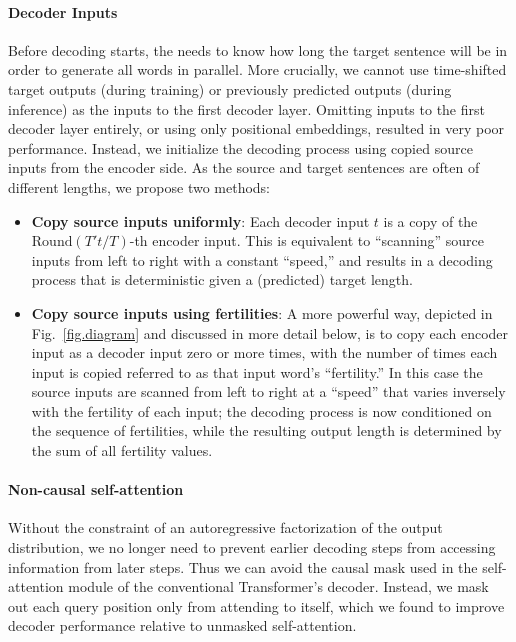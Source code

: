 \paragraph{Decoder Inputs}
Before decoding starts, the \model{} needs to know how long the target sentence will be in order to generate all words in parallel.
More crucially, we cannot use time-shifted target outputs (during training) or previously predicted outputs (during inference) as the inputs to the first decoder layer.
Omitting inputs to the first decoder layer entirely, or using only positional embeddings, resulted in very poor performance.
Instead, we initialize the decoding process using copied source inputs from the encoder side. As the source and target sentences are often of different lengths, we propose two methods:
\begin{itemize}[leftmargin=*]
\item \textbf{Copy source inputs uniformly}: Each decoder input $t$ is a copy of the $\text{Round}(T't/T)$-th encoder input. This is equivalent to ``scanning'' source inputs from left to right with a constant ``speed,'' and results in a decoding process that is deterministic given a (predicted) target length.
\item \textbf{Copy source inputs using fertilities}: A more powerful way, depicted in Fig.~\ref{fig.diagram} and discussed in more detail below, 
is to copy each encoder input as a decoder input zero or more times, with the number of times each input is copied referred to as that input word's ``fertility.''
In this case the source inputs are scanned from left to right at a ``speed'' that varies inversely with the fertility of each input; the decoding process is now conditioned on the sequence of fertilities, while the resulting output length is determined by the sum of all fertility values. 
\end{itemize}

\vspace{-5pt}
\paragraph{Non-causal self-attention}
Without the constraint of an autoregressive factorization of the output distribution, we no longer need to prevent earlier decoding steps from accessing information from later steps. Thus we can avoid the causal mask used in the self-attention module of the conventional Transformer's decoder. Instead, we  mask out each query position only from attending to itself, which we found to improve decoder performance relative to unmasked self-attention.

